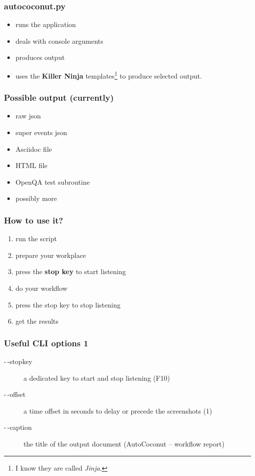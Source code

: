 \documentclass[14pt]{beamer}
\begin{document}
\begin{frame}
	\frametitle{autococonut.py}
	\begin{itemize}
	\item runs the application
	\item deals with console arguments
	\item produces output 
	\item uses the \textbf{Killer Ninja} templates\footnote{I know they are called \textit{Jinja}.} to produce selected output.
\end{itemize}	
\end{frame}

\begin{frame}
	\frametitle{Possible output (currently)}
		\begin{itemize}
		\item raw json
		\item super events json
		\item Asciidoc file
		\item HTML file
		\item OpenQA test subroutine
		\item possibly more
		\end{itemize}	
\end{frame}

\begin{frame}
	\frametitle{How to use it?}
	\begin{enumerate}
		\item run the script
		\item prepare your workplace
		\item press the \textbf{stop key} to start listening
		\item do your workflow
		\item press the stop key to stop listening
		\item get the results
	\end{enumerate}
\end{frame}

\begin{frame}
	\frametitle{Useful CLI options 1}
	\begin{description}
		\item[{\color{blue}-\,-stopkey}] a dedicated key to start and stop listening (F10)
		\item[{\color{blue}-\,-offset}] a time offset in seconds to delay or precede the screenshots (1)
		\item[{\color{blue}-\,-caption}] the title of the output document (AutoCoconut -- workflow report)
	\end{description}
\end{frame}
\end{document}
